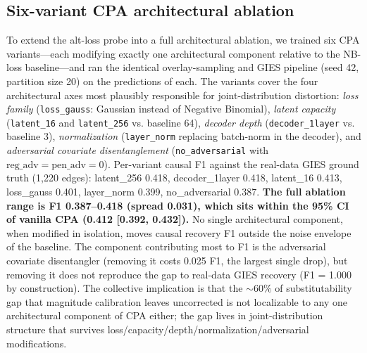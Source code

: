 \documentclass{article}
\theoremstyle{plain}
\theoremstyle{definition}
\theoremstyle{remark}
\begin{document}
\subsection{Six-variant CPA architectural ablation}
\label{app:cpa_ablation}
To extend the alt-loss probe into a full architectural ablation, we trained six CPA variants---each modifying exactly one architectural component relative to the NB-loss baseline---and ran the identical overlay-sampling and GIES pipeline (seed 42, partition size 20) on the predictions of each. The variants cover the four architectural axes most plausibly responsible for joint-distribution distortion: \textit{loss family} (\texttt{loss\_gauss}: Gaussian instead of Negative Binomial), \textit{latent capacity} (\texttt{latent\_16} and \texttt{latent\_256} vs. baseline 64), \textit{decoder depth} (\texttt{decoder\_1layer} vs. baseline 3), \textit{normalization} (\texttt{layer\_norm} replacing batch-norm in the decoder), and \textit{adversarial covariate disentanglement} (\texttt{no\_adversarial} with $\mathrm{reg\_adv}=\mathrm{pen\_adv}=0$). Per-variant causal F1 against the real-data GIES ground truth (1{,}220 edges):  latent\_256 0.418, decoder\_1layer 0.418, latent\_16 0.413, loss\_gauss 0.401, layer\_norm 0.399, no\_adversarial 0.387. \textbf{The full ablation range is F1 0.387--0.418 (spread 0.031), which sits within the 95\% CI of vanilla CPA (0.412 [0.392, 0.432]).} No single architectural component, when modified in isolation, moves causal recovery F1 outside the noise envelope of the baseline. The component contributing most to F1 is the adversarial covariate disentangler (removing it costs 0.025 F1, the largest single drop), but removing it does not reproduce the gap to real-data GIES recovery (F1 = 1.000 by construction). The collective implication is that the ${\sim}60\%$ of substitutability gap that magnitude calibration leaves uncorrected is not localizable to any one architectural component of CPA either; the gap lives in joint-distribution structure that survives loss/capacity/depth/normalization/adversarial modifications.
\end{document}
